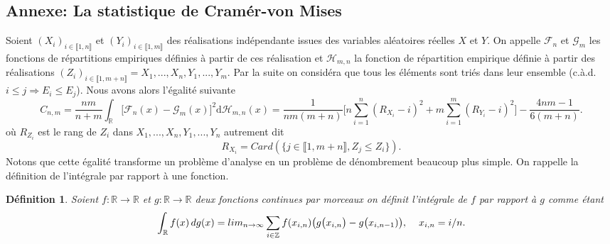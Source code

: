 \documentclass[a4paper,11pt]{article}
\numberwithin{equation}{section}
\newtheorem{definition}{Définition}
\begin{document}
\subsection{Annexe: La statistique de Cramér-von Mises}
\label{lemme Cramer-von Mise}
Soient $(X_i)_{i\in \llbracket 1,n \rrbracket}$ et $(Y_i)_{i\in \llbracket 1,m \rrbracket }$ des réalisations indépendante issues des variables aléatoires réelles $X$ et $Y$. On appelle $\mathcal{F}_{n}$ et $\mathcal{G}_{m}$ les fonctions de répartitions empiriques définies à partir de ces réalisation et $\mathcal{H}_{m,n}$ la fonction de répartition empirique définie à partir des réalisations $(Z_i)_{i\in \llbracket 1,m+n \rrbracket }=X_1,...,X_n,Y_1,...,Y_m$. Par la suite on considéra que tous les éléments sont triés dans leur ensemble (c.à.d. $i\leq j \Rightarrow E_i\leq E_j$). Nous avons alors l'égalité suivante
\begin{equation}
	C_{n,m}=\frac{nm}{n+m}\int_{\mathbb{R}}\big[ \mathcal{F}_{n}(x)-\mathcal{G}_{m}(x)\big]^{2} \mathrm{d} \mathcal{H}_{m,n}(x)=\frac{1}{nm(m+n)}\Big[ n\sum_{i=1}^{n}(R_{X_i}-i)^2+ m\sum_{i=1}^{m}(R_{Y_i}-i)^2\Big]-\frac{4nm-1}{6(m+n)}.
\end{equation}
où $R_{Z_i}$ est le rang de $Z_i$ dans $X_1,...,X_n,Y_1,...,Y_n$ autrement dit 
\[R_{X_i}=Card(\{j \in \llbracket 1,m+n \rrbracket , Z_j\leq Z_i\}).\] 
Notons que cette égalité transforme un problème d'analyse en un problème de dénombrement beaucoup plus simple. On rappelle la définition de l'intégrale par rapport à une fonction.
\begin{definition}
	Soient $f:\mathbb{R} \to \mathbb{R}$ et $g:\mathbb{R} \to \mathbb{R}$ deux fonctions continues par morceaux on définit l'intégrale de $f$ par rapport à $g$ comme étant
	\[\int_{\mathbb{R}}f(x)\, dg(x)=lim_{n\to\infty}\sum_{i \in \mathbb{Z}}f(x_{i,n})\big( g\big(x_{i,n}\big)-g\big(x_{i,n-1})\big),\hspace{4mm}x_{i,n}=i/n.\]
\end{definition}
\end{document}

